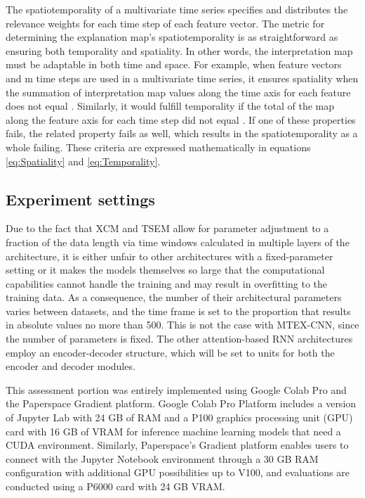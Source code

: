 \documentclass{svproc}
\begin{document}
The spatiotemporality of a multivariate time series specifies and distributes the relevance weights for each time step of each feature vector. The metric for determining the explanation map's spatiotemporality is as straightforward as ensuring both temporality and spatiality. In other words, the interpretation map must be adaptable in both time and space. For example, when  feature vectors and m time steps are used in a multivariate time series, it ensures spatiality when the summation of interpretation map values along the time axis for each feature does not equal . Similarly, it would fulfill temporality if the total of the map along the feature axis for each time step  did not equal . If one of these properties fails, the related property fails as well, which results in the spatiotemporality as a whole failing.
These criteria are expressed mathematically in equations \ref{eq:Spatiality} and \ref{eq:Temporality}.



\subsection{Experiment settings}

Due to the fact that XCM and TSEM allow for parameter adjustment to a fraction of the data length via time windows calculated in multiple layers of the architecture, it is either unfair to other architectures with a fixed-parameter setting or it makes the models themselves so large that the computational capabilities cannot handle the training and may result in overfitting to the training data. As a consequence, the number of their architectural parameters varies between datasets, and the time frame is set to the proportion that results in absolute values no more than 500. This is not the case with MTEX-CNN, since the number of parameters is fixed. The other attention-based RNN architectures employ an encoder-decoder structure, which will be set to  units for both the encoder and decoder modules. 

This assessment portion was entirely implemented using Google Colab Pro and the Paperspace Gradient platform. Google Colab Pro Platform includes a version of Jupyter Lab with 24 GB of RAM and a P100 graphics processing unit (GPU) card with 16 GB of VRAM for inference machine learning models that need a CUDA environment. Similarly, Paperspace's Gradient platform enables users to connect with the Jupyter Notebook environment through a 30 GB RAM configuration with additional GPU possibilities up to V100, and evaluations are conducted using a P6000 card with 24 GB VRAM. 
\end{document}
